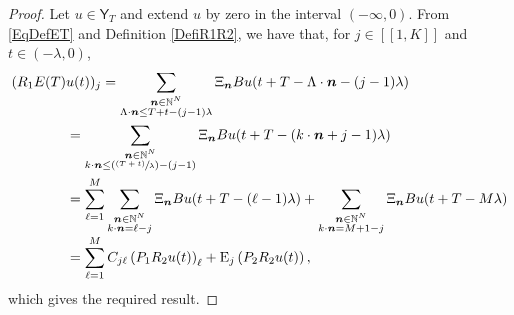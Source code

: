 \documentclass[JEP,XML,SOM,Unicode]{cedram}
\newcommand{\Psfrac}[2]{(\sfrac{#1}{#2})}
\newcommand{\bn}{\boldsymbol{n}}
\newcommand{\llbracket}{[\![}
\newcommand{\rrbracket}{]\!]}
\theoremstyle{plain}
\theoremstyle{definition}
\newcommand{\Epsilon}{\mathrm E}
\begin{document}
\begin{proof}
Let $u \in \mathsf Y_T$ and extend $u$ by zero in the interval $(-\infty, 0)$. From \eqref{EqDefET} and Definition \ref{DefiR1R2}, we have that, for $j \in \llbracket 1, K\rrbracket$ and $t \in (-\lambda, 0)$,
\begin{align*}
(R_1 E(T) &u(t))_{j} = \sum_{\substack{\bn \in \mathbb N^N \\ \Lambda \cdot \bn \leq T + t - (j - 1)\lambda}} \Xi_{\bn} B u(t + T - \Lambda \cdot \bn - (j - 1)\lambda)  \\
& = \sum_{\substack{\bn \in \mathbb N^N \\ k \cdot \bn \leq \Psfrac{(T + t)}{\lambda} - (j - 1)}} \Xi_{\bn} B u(t + T - (k \cdot \bn + j - 1)\lambda)  \\
& = \sum_{\ell=1}^M \sum_{\substack{\bn \in \mathbb N^N \\ k \cdot \bn = \ell - j}} \Xi_{\bn} B u(t + T - (\ell - 1)\lambda) + \sum_{\substack{\bn \in \mathbb N^N \\ k \cdot \bn = M+1 - j}} \Xi_{\bn} B u(t + T - M \lambda)  \\[-3pt]
& = \sum_{\ell=1}^M C_{j\ell} \left(P_1 R_2 u(t)\right)_{\ell} + \Epsilon_j \left(P_2 R_2 u(t)\right),
\end{align*}
which gives the required result.
\end{proof}
\end{document}

